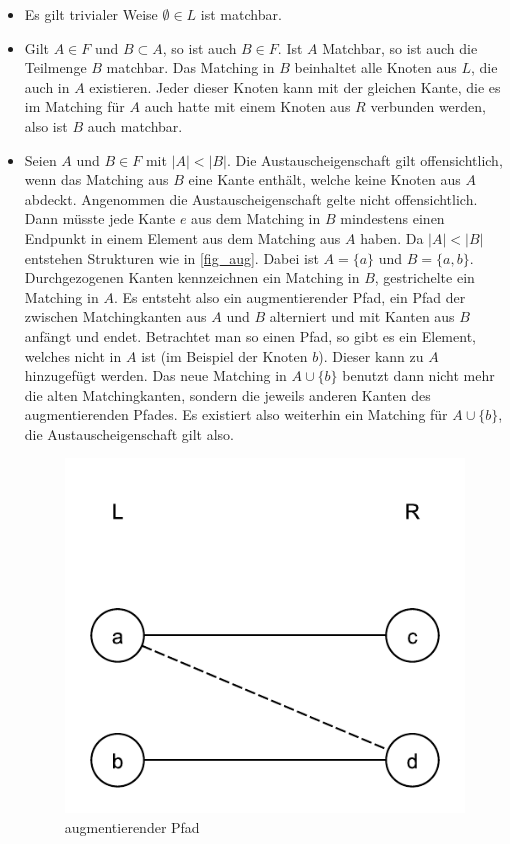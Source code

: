 \begin{itemize}
\item Es gilt trivialer Weise $\emptyset \in L$ ist matchbar.

\item Gilt $A \in F$ und $B \subset A$, so ist auch $B \in F$. Ist $A$ Matchbar, so ist auch die Teilmenge $B$ matchbar. Das Matching in $B$ beinhaltet alle Knoten aus $L$, die auch in $A$ existieren. Jeder dieser Knoten kann mit der gleichen Kante, die es im Matching für $A$ auch hatte mit einem Knoten aus $R$ verbunden werden, also ist $B$ auch matchbar.

\item Seien $A$ und $B \in F$ mit $|A| < |B|$. Die Austauscheigenschaft gilt offensichtlich, wenn das Matching aus $B$ eine Kante enthält, welche keine Knoten aus $A$ abdeckt. Angenommen die Austauscheigenschaft gelte nicht offensichtlich. Dann müsste jede Kante $e$ aus dem Matching in $B$ mindestens einen Endpunkt in einem Element aus dem Matching aus $A$ haben. Da $|A| < |B|$ entstehen Strukturen wie in \autoref{fig_aug}. Dabei ist $A=\{a\}$ und $B=\{a,b\}$. Durchgezogenen Kanten kennzeichnen ein Matching in $B$, gestrichelte ein Matching in $A$. Es entsteht also ein augmentierender Pfad, ein Pfad der zwischen Matchingkanten aus $A$ und $B$ alterniert und mit Kanten aus $B$ anfängt und endet. Betrachtet man so einen Pfad, so gibt es ein Element, welches nicht in $A$ ist (im Beispiel der Knoten $b$). Dieser kann zu $A$ hinzugefügt werden. Das neue Matching in $A \cup \{b\}$ benutzt dann nicht mehr die alten Matchingkanten, sondern die jeweils anderen Kanten des augmentierenden Pfades. Es existiert also weiterhin ein Matching für $A\cup \{b\}$, die Austauscheigenschaft gilt also.

\begin{figure}[h]
\center
\includegraphics[scale=0.5]{fig/aug}
\caption{augmentierender Pfad}
\label{fig_aug}
\end{figure}

\end{itemize}

